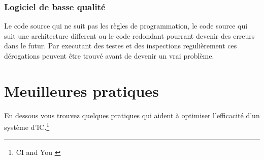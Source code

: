 \subsubsection{Logiciel de basse qualité }
Le code source qui ne suit pas les règles de programmation, le code source qui suit une architecture different ou le code redondant pourrant devenir des erreurs dans le futur.
Par executant des testes et des inspections regulièrement ces dérogations peuvent être trouvé avant de devenir un vrai problème.
\clearpage

\section{Meuilleures pratiques}
\label{sec:meuilleurespratiques}

En dessous vous trouvez quelques pratiques qui aident à optimiser l'efficacité d'un système d'IC.\footnote{CI and You \cite[p~47]{duvallconint}}

